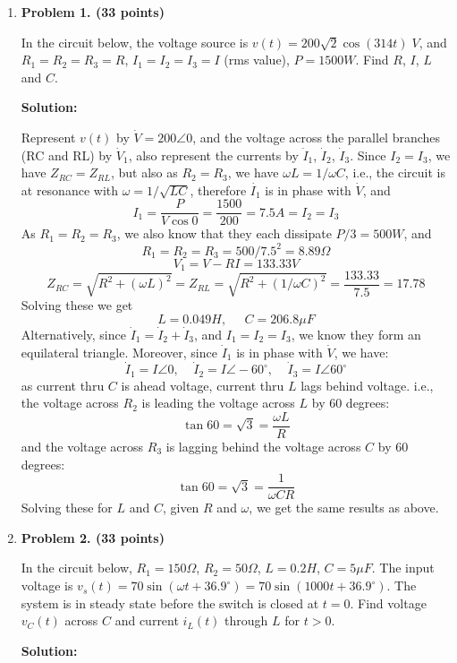 \begin{enumerate}

\item {\bf Problem 1. (33 points)} 

In the circuit below, the voltage source is $v(t)=200\sqrt{2}\cos (314 t)\;V$,
and $R_1=R_2=R_3=R$, $I_1=I_2=I_3=I$ (rms value), $P=1500 W$. Find $R$, $I$, 
$L$ and $C$.


{\bf Solution:}

Represent $v(t)$ by $\dot{V}=200\angle 0$, and the voltage across the parallel 
branches (RC and RL) by $\dot{V}_1$, also represent the currents by $\dot{I}_1$, 
$\dot{I}_2$, $\dot{I}_3$. Since $I_2=I_3$, we have $Z_{RC}=Z_{RL}$, but also as
$R_2=R_3$, we have $\omega L=1/\omega C$, i.e., the circuit is at resonance with 
$\omega=1/\sqrt{LC}$, therefore $\dot{I_1}$ is in phase with $\dot{V}$, and 
\[ I_1=\frac{P}{V \cos 0}=\frac{1500}{200}=7.5A =I_2=I_3 \]
As $R_1=R_2=R_3$, we also know that they each dissipate $P/3=500W$, and
\[ R_1=R_2=R_3=500/7.5^2=8.89\Omega \]
\[ V_1=V-RI=133.33 V \]
\[ Z_{RC}=\sqrt{R^2+(\omega L)^2}=Z_{RL}=\sqrt{R^2+(1/\omega C)^2}=\frac{133.33}{7.5}=17.78 \]
Solving these we get
\[ L=0.049H, \;\;\;\;\;C=206.8\mu F \]
Alternatively, since $\dot{I}_1=\dot{I}_2+\dot{I}_3$, and $I_1=I_2=I_3$, we know 
they form an equilateral triangle. Moreover, since $\dot{I}_1$ is in phase with
$\dot{V}$, we have:
\[ \dot{I}_1=I\angle 0,\;\;\;\;\dot{I}_2=I\angle -60^\circ,\;\;\;\;\dot{I}_3=I\angle 60^\circ \]
as current thru $C$ is ahead voltage, current thru $L$ lags behind voltage.
i.e., the voltage across $R_2$ is leading the voltage across $L$ by 60 degrees:
\[ \tan 60=\sqrt{3}= \frac{\omega L}{R} \]
and the voltage across $R_3$ is lagging behind the voltage across $C$ by 60 degrees:
\[ \tan 60=\sqrt{3}= \frac{1}{\omega CR} \]
Solving these for $L$ and $C$, given $R$ and $\omega$, we get the same results
as above.

\item {\bf Problem 2. (33 points)} 

In the circuit below, $R_1=150\Omega$, $R_2=50\Omega$, $L=0.2H$, $C=5\mu F$.
The input voltage is $v_s(t)=70\sin(\omega t+36.9^\circ)=70\sin(1000 t+36.9^\circ)$.
The system is in steady state before the switch is closed at $t=0$. Find voltage 
$v_C(t)$ across $C$ and current $i_L(t)$ through $L$ for $t>0$.


{\bf Solution:} 


\end{enumerate}
